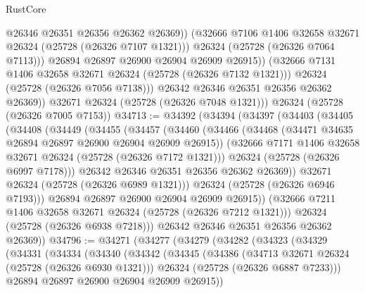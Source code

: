 \begin{lexlean}{RustCore}
\begin{coremodule}
                      @26346
                      @26351
                      @26356
                      @26362
                      @26369))
                  (@32666 @7106 @1406 @32658 @32671 @26324 (@25728 (@26326 @7107 @1321)))
                  @26324
                  (@25728 (@26326 @7064 @7113)))
                @26894
                @26897
                @26900
                @26904
                @26909
                @26915))
            (@32666 @7131 @1406 @32658 @32671 @26324 (@25728 (@26326 @7132 @1321)))
            @26324
            (@25728 (@26326 @7056 @7138)))
          @26342
          @26346
          @26351
          @26356
          @26362
          @26369))
      @32671
      @26324
      (@25728 (@26326 @7048 @1321)))
    @26324
    (@25728 (@26326 @7005 @7153))
@34713 := @34392
    (@34394
      (@34397
        (@34403
          (@34405
            (@34408
              (@34449
                (@34455
                  (@34457
                    (@34460
                      (@34466
                        (@34468 (@34471 @34635 @26894 @26897 @26900 @26904 @26909 @26915))
                        (@32666 @7171 @1406 @32658 @32671 @26324 (@25728 (@26326 @7172 @1321)))
                        @26324
                        (@25728 (@26326 @6997 @7178)))
                      @26342
                      @26346
                      @26351
                      @26356
                      @26362
                      @26369))
                  @32671
                  @26324
                  (@25728 (@26326 @6989 @1321)))
                @26324
                (@25728 (@26326 @6946 @7193)))
              @26894
              @26897
              @26900
              @26904
              @26909
              @26915))
          (@32666 @7211 @1406 @32658 @32671 @26324 (@25728 (@26326 @7212 @1321)))
          @26324
          (@25728 (@26326 @6938 @7218)))
        @26342
        @26346
        @26351
        @26356
        @26362
        @26369))
@34796 := @34271
    (@34277
      (@34279
        (@34282
          (@34323
            (@34329
              (@34331
                (@34334
                  (@34340
                    (@34342
                      (@34345
                        (@34386
                          (@34713 @32671 @26324 (@25728 (@26326 @6930 @1321)))
                          @26324
                          (@25728 (@26326 @6887 @7233)))
                        @26894
                        @26897
                        @26900
                        @26904
                        @26909
                        @26915))

\end{coremodule}
\end{lexlean}

